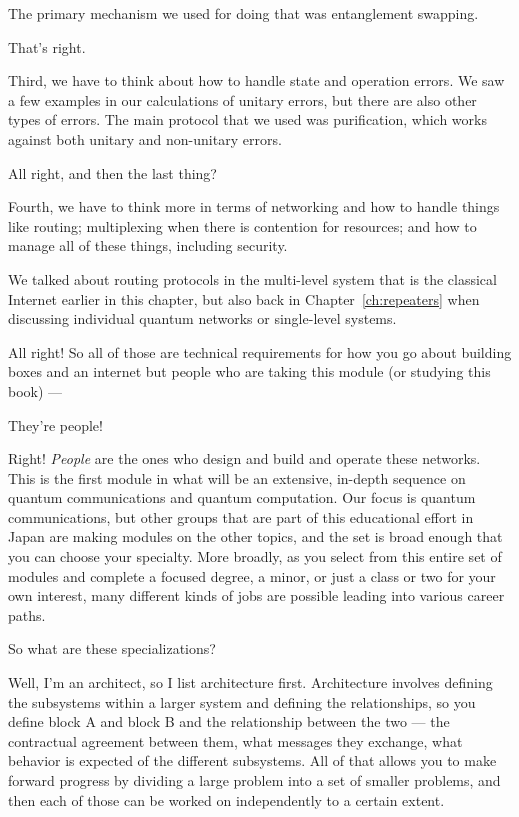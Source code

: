 \rrr The primary mechanism we used for doing that was entanglement swapping. 

\mmm That's right.

Third, we have to think about how to handle state and operation errors. We saw a few examples in our calculations of unitary errors, but there are also other types of errors. The main protocol that we used was purification, which works against both unitary and non-unitary errors.

\rrr All right, and then the last thing?

\mmm Fourth, we have to think more in terms of networking and how to handle things like routing; multiplexing when there is contention for resources; and how to manage all of these things, including security.

\rrr We talked about routing protocols in the multi-level system that is the classical Internet earlier in this chapter, but also back in Chapter~\ref{ch:repeaters} when discussing individual quantum networks or single-level systems.

All right! So all of those are technical requirements for how you go about building boxes and an internet but people who are taking this module (or studying this book) ---

\mmm They're people! 

\rrr Right! \emph{People} are the ones who design and build and operate these networks. This is the first module in what will be an extensive, in-depth sequence on quantum communications and quantum computation.  Our focus is quantum communications, but other groups that are part of this educational effort in Japan are making modules on the other topics, and the set is broad enough that you can choose your specialty. More broadly, as you select from this entire set of modules and complete a focused degree, a minor, or just a class or two for your own interest, many different kinds of jobs are possible leading into various career paths.

\mmm So what are these specializations?

\rrr Well, I'm an architect, so I list architecture first. Architecture involves defining the subsystems within a larger system and defining the relationships, so you define block A and block B and the relationship between the two --- the contractual agreement between them, what messages they exchange, what behavior is expected of the different subsystems. All of that allows you to make forward progress by dividing a large problem into a set of smaller problems, and then each of those can be worked on independently to a certain extent.

